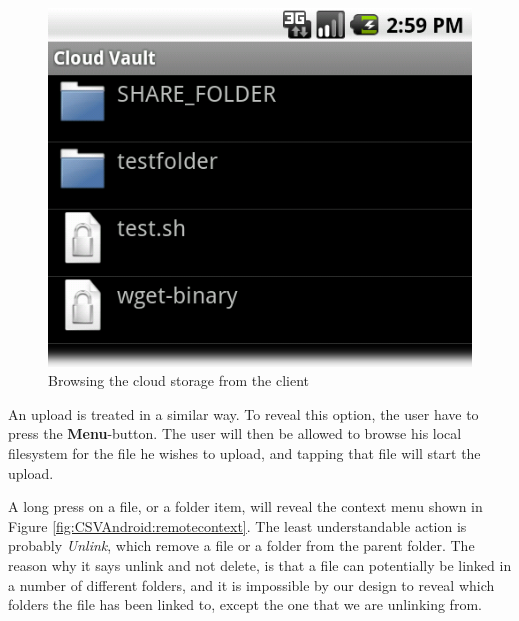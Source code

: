 \documentclass[pdftex,english,10pt,b5paper,twoside]{book}
\begin{document}
\begin{figure}[h!]
    \centering
    \includegraphics[scale=0.4]{client-remotebrowse.png}
    \caption{Browsing the cloud storage from the client}
    \label{fig:CSVAndroid:remotebrowse}
\end{figure}

An upload is treated in a similar way. To reveal this option, the user have to
press the \textbf{Menu}-button. The user will then be allowed to browse his
local filesystem for the file he wishes to upload, and tapping that file will
start the upload.

A long press on a file, or a folder item, will reveal the context menu shown in
Figure \ref{fig:CSVAndroid:remotecontext}. The least understandable action is
probably \emph{Unlink}, which remove a file or a folder from the parent folder.
The reason why it says unlink and not delete, is that a file can potentially be
linked in a number of different folders, and it is impossible by our design to
reveal which folders the file has been linked to, except the one that we are
unlinking from.
\end{document}
